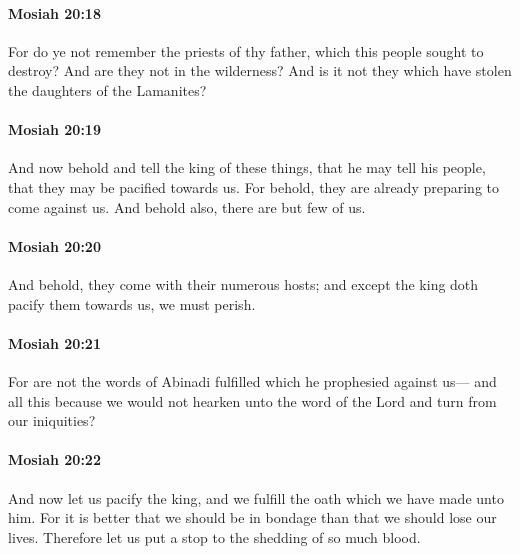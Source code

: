 		\paragraph{Mosiah 20:18} %
			\label{MOSIAH-20-18}

			For do ye not remember the priests of thy father,
			which this people sought to destroy?
			And are they not in the wilderness?
			And is it not they which have stolen the daughters of the Lamanites?

		\paragraph{Mosiah 20:19} %
			\label{MOSIAH-20-19}

			And now behold and tell the king of these things,
			that he may tell his people, that they may be pacified towards us.
			For behold, they are already preparing to come against us.
			And behold also, there are but few of us.

		\paragraph{Mosiah 20:20} %
			\label{MOSIAH-20-20}

			And behold, they come with their numerous hosts;
			and except the king doth pacify them towards us, we must perish.

		\paragraph{Mosiah 20:21} %
			\label{MOSIAH-20-21}

			For are not the words of Abinadi fulfilled which he prophesied against us---
			and all this because we would not hearken unto the word of the Lord
			and turn from our iniquities?

		\paragraph{Mosiah 20:22} %
			\label{MOSIAH-20-22}

			And now let us pacify the king,
			and we fulfill the oath which we have made unto him.
			For it is better that we should be in bondage
			than that we should lose our lives.
			Therefore let us put a stop to the shedding of so much blood.

